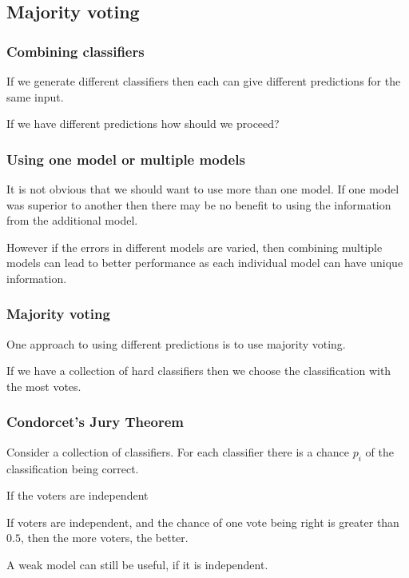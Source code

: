 
\subsection{Majority voting}

\subsubsection{Combining classifiers}

If we generate different classifiers then each can give different predictions for the same input.

If we have different predictions how should we proceed?

\subsubsection{Using one model or multiple models}

It is not obvious that we should want to use more than one model. If one model was superior to another then there may be no benefit to using the information from the additional model.

However if the errors in different models are varied, then combining multiple models can lead to better performance as each individual model can have unique information.

\subsubsection{Majority voting}

One approach to using different predictions is to use majority voting.

If we have a collection of hard classifiers then we choose the classification with the most votes.

\subsubsection{Condorcet's Jury Theorem}

Consider a collection of classifiers. For each classifier there is a chance \(p_i\) of the classification being correct.

If the voters are independent

If voters are independent, and the chance of one vote being right is greater than \(0.5\), then the more voters, the better.

A weak model can still be useful, if it is independent.

